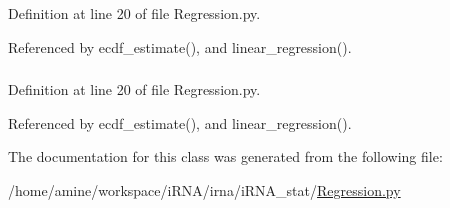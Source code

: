 \-Definition at line 20 of file \-Regression.\-py.



\-Referenced by ecdf\-\_\-estimate(), and linear\-\_\-regression().

\hypertarget{classirna_1_1iRNA__stat_1_1Regression_1_1Regression_a4372c52d70388f475e06e3e505e972c9}{
\subsubsection[{unique\-\_\-s\-R\-N\-Aidinint}]{}}
\label{classirna_1_1iRNA__stat_1_1Regression_1_1Regression_a4372c52d70388f475e06e3e505e972c9}


\-Definition at line 20 of file \-Regression.\-py.



\-Referenced by ecdf\-\_\-estimate(), and linear\-\_\-regression().



\-The documentation for this class was generated from the following file\-:\begin{DoxyCompactItemize}
\item 
/home/amine/workspace/i\-R\-N\-A/irna/i\-R\-N\-A\-\_\-stat/\hyperlink{Regression_8py}{\-Regression.\-py}\end{DoxyCompactItemize}
